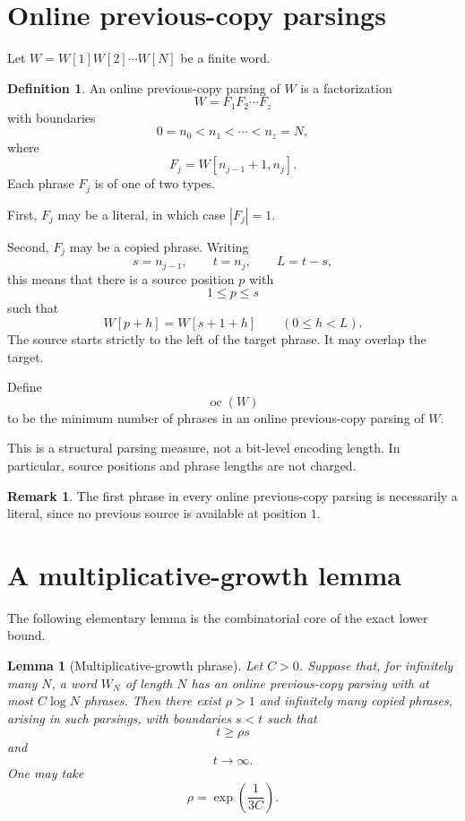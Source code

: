 \documentclass[11pt]{amsart}
\newtheorem{lemma}[theorem]{Lemma}
\theoremstyle{definition}
\newtheorem{definition}[theorem]{Definition}
\newtheorem{remark}[theorem]{Remark}
\DeclareMathOperator{\oc}{oc}
\begin{document}
\section{Online previous-copy parsings}

Let \(W=W[1]W[2]\cdots W[N]\) be a finite word.

\begin{definition}
An online previous-copy parsing of \(W\) is a factorization
\[
W=F_1F_2\cdots F_z
\]
with boundaries
\[
0=n_0<n_1<\cdots<n_z=N,
\]
where
\[
F_j=W[n_{j-1}+1,n_j].
\]
Each phrase \(F_j\) is of one of two types.

First, \(F_j\) may be a literal, in which case \(|F_j|=1\).

Second, \(F_j\) may be a copied phrase. Writing
\[
s=n_{j-1},
\qquad
t=n_j,
\qquad
L=t-s,
\]
this means that there is a source position \(p\) with
\[
1\leq p\leq s
\]
such that
\[
W[p+h]=W[s+1+h]
\qquad(0\leq h<L).
\]
The source starts strictly to the left of the target phrase. It may overlap the target.
\end{definition}

Define
\[
\oc(W)
\]
to be the minimum number of phrases in an online previous-copy parsing of \(W\).

This is a structural parsing measure, not a bit-level encoding length. In particular, source positions and phrase lengths are not charged.

\begin{remark}
The first phrase in every online previous-copy parsing is necessarily a literal, since no previous source is available at position \(1\).
\end{remark}

\section{A multiplicative-growth lemma}

The following elementary lemma is the combinatorial core of the exact lower bound.

\begin{lemma}[Multiplicative-growth phrase]
Let \(C>0\). Suppose that, for infinitely many \(N\), a word \(W_N\) of length \(N\) has an online previous-copy parsing with at most \(C\log N\) phrases. Then there exist \(\rho>1\) and infinitely many copied phrases, arising in such parsings, with boundaries \(s<t\) such that
\[
t\geq \rho s
\]
and
\[
t\to\infty.
\]
One may take
\[
\rho=\exp\left(\frac1{3C}\right).
\]
\end{lemma}
\end{document}
